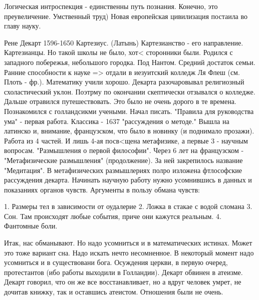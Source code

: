 Логическая интроспекция - единственны путь познания. Конечно, это преувеличение. Умственный труд) Новая европейская цивилизация постаила во главу науку.



Рене Декарт 1596-1650 
Картезиус. (Латынь)
Картезианство - его направление. Картезианцы. Но такой школы не было, хот< сторонники были.
Родился с западного побережья, небольшого городка. Под Нантом. Средний достаток семьи. Ранние способности к науке => отдали в иезуитский колледж Ля Флеш (см. Плоть - фр.). Математику учили хорошо. Декарта разочаровывал религиозный схоластический уклон. Поэтрму по окончании скептически отзывался о колледже. Дальше отравился путешествовать. Это было не очень дорого в те времена. Познакомился с голландсикми учеными. Начал писать. "Правила для руководства ума" - первая работа. Классика - 1637 "рассуждения о методе." Вышла на латинско и, внимание, французском, что было в новинку (и поднимало прозажи). Работа из 4 частей. И лишь 4-ая посв<щена метафизике, а первые 3 - научным вопросам. "Размышления о первой философии". Через 6 лет на французском - "Метафизические размышления" (продолжение). За ней закрепилось название "Медитация". В метафизических размышлериях полро изложена фтлософские рассуждения декарта. Начинать научную работу нужно усомнившись в данных и показаниях органов чувств. Аргументы в пользу обмана чувств:

	1. Размеры тел в зависимости от оудалерие
	2. Ложка в стакае с водой сломана
	3. Сон. Там происходят любые события, приче они кажутся реальным.
	4. Фантомные боли.

Итак, нас обманывают. Но надо усомниться и в математических истинах. Может это тоже вариант сна. Надо искать нечто несомненное. В некоторый момент надо усомниться и в существовани  бога. Осуждения церкви, в первую очеред, протестантов (ибо работы выходили в Голландии). Декарт обвинен в атеизме. Декарт говорил, что он же все восстанавливает, но а вдруг человек умрет, не дочитав книжку, так и оставшись атеистом. Отношения были не очень.

